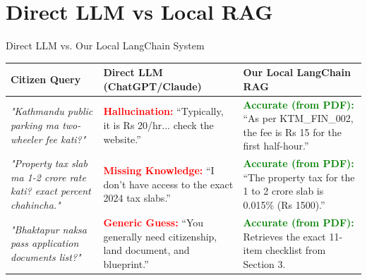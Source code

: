 \documentclass[11pt,aspectratio=169]{beamer}
\begin{document}
\section{Direct LLM vs Local RAG}
\begin{frame}{Direct LLM vs. Our Local LangChain System}
    \begin{table}[]
        \centering
        \footnotesize
        \begin{tabular}{@{}p{3.8cm} p{4.5cm} p{4.5cm}@{}}
        \toprule
        \textbf{Citizen Query} & \textbf{Direct LLM (ChatGPT/Claude)} & \textbf{Our Local LangChain RAG} \\ \midrule
        
        \textit{"Kathmandu public parking ma two-wheeler fee kati?"} & 
        \textcolor{red}{\textbf{Hallucination:}} ``Typically, it is Rs 20/hr... check the website.'' & 
        \textcolor{green}{\textbf{Accurate (from PDF):}} ``As per KTM\_FIN\_002, the fee is Rs 15 for the first half-hour.'' \\ \midrule
        
        \textit{"Property tax slab ma 1-2 crore rate kati? exact percent chahincha."} & 
        \textcolor{red}{\textbf{Missing Knowledge:}} ``I don't have access to the exact 2024 tax slabs.'' & 
        \textcolor{green}{\textbf{Accurate (from PDF):}} ``The property tax for the 1 to 2 crore slab is 0.015\% (Rs 1500).'' \\ \midrule
        
        \textit{"Bhaktapur naksa pass application documents list?"} & 
        \textcolor{red}{\textbf{Generic Guess:}} ``You generally need citizenship, land document, and blueprint.'' & 
        \textcolor{green}{\textbf{Accurate (from PDF):}} Retrieves the exact 11-item checklist from Section 3. \\ \bottomrule
        \end{tabular}
    \end{table}
\end{frame}

\end{document}
